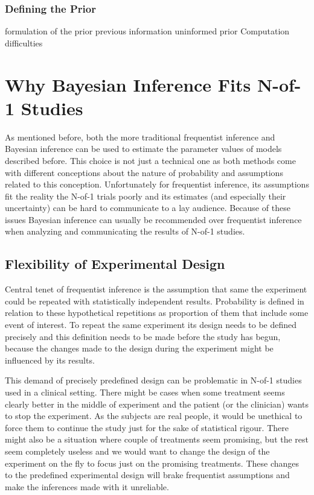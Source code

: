 \documentclass[12pt,a4paper,leqno]{report}
\theoremstyle{plain}
\theoremstyle{definition}
\theoremstyle{remark}
\begin{document}
\subsubsection{Defining the Prior}\label{bayesproblems}

formulation of the prior
    previous information
    uninformed prior
Computation difficulties

\section{Why Bayesian Inference Fits N-of-1 Studies}\label{whybayes}

As mentioned before, both the more traditional frequentist inference and Bayesian inference can
be used to estimate the parameter values of models described before. This choice is not just a technical
one as both methods come with different conceptions about the nature of probability and assumptions
related to this conception. Unfortunately for frequentist inference, its assumptions fit the reality
the N-of-1 trials poorly and its estimates (and especially their uncertainty) can be hard to communicate
to a lay audience. Because of these issues Bayesian inference can usually be recommended over frequentist
inference when analyzing and communicating the results of N-of-1 studies.

\subsection{Flexibility of Experimental Design}\label{whybayes}

Central tenet of frequentist inference is the assumption that same the experiment could be repeated with
statistically independent results. Probability is defined in relation to these hypothetical repetitions
as proportion of them that include some event of interest.
To repeat the same experiment its design needs to be defined precisely
and this definition needs to be made before the study has begun,
because the changes made to the design during the experiment might be influenced by its results.

This demand of precisely predefined design can be problematic in N-of-1 studies used in a clinical setting.
There might be cases when some treatment seems clearly better in the middle of experiment and the patient
(or the clinician) wants to stop the experiment.
As the subjects are real people, it would be unethical to force them to continue the study just for the sake
of statistical rigour.
There might also be a situation where couple of treatments seem promising, but the rest seem completely useless
and we would want to change the design of the experiment on the fly to focus just on the promising treatments.
These changes to the predefined experimental design will brake frequentist assumptions and make
the inferences made with it unreliable.
\end{document}
